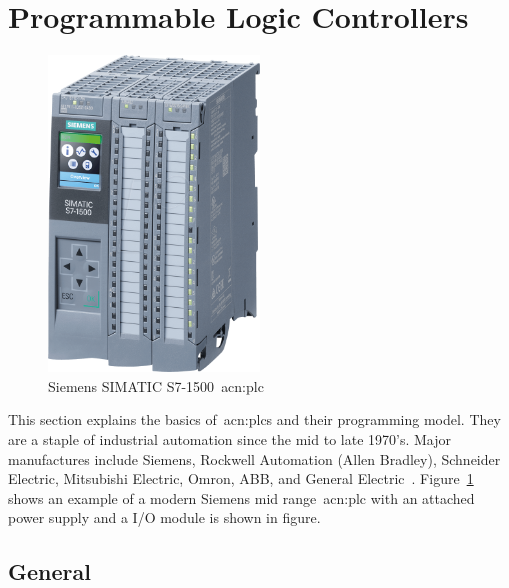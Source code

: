 \section{Programmable Logic Controllers}
\label{sec:plc}

 
\begin{figure}
    \centering
    \includegraphics[width=0.5\textwidth]{Figures/simatic_s7-1500.png}
    \caption[Siemens SIMATIC S7-1500]{Siemens SIMATIC S7-1500~\acrshort{acn:plc}~\cite{Reichelt:2020}}
    \label{fig:simatic_s7}
\end{figure}

This section explains the basics of~\glspl{acn:plc} and their programming model.
They are a staple of industrial automation since the mid to late 1970's.
Major manufactures include Siemens, Rockwell Automation (Allen Bradley), Schneider Electric, Mitsubishi Electric, Omron, ABB, and General Electric~\cite{Businesswire:2016}.
Figure~\ref{fig:simatic_s7} shows an example of a modern Siemens mid range~\acrshort{acn:plc} with an attached power supply and a I/O module is shown in figure.

\subsection{General}


